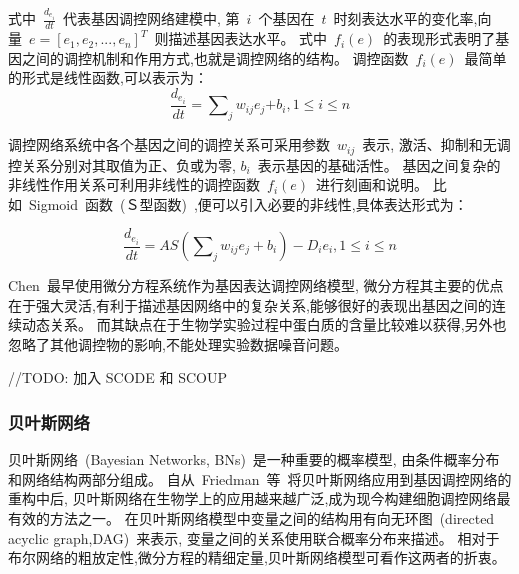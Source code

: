 式中~$\frac{{d_{e_i }}}{{dt}}$~代表基因调控网络建模中,
第~$i$~个基因在~$t$~时刻表达水平的变化率,向量~$e=[e_1,e_2,...,e_n]^T$~则描述基因表达水平。
式中~$f_i(e)$~的表现形式表明了基因之间的调控机制和作用方式,也就是调控网络的结构。
调控函数~$f_i(e)$~最简单的形式是线性函数,可以表示为：
\begin{equation}
\frac{{d_{e_i }}}{{dt}} = \sum\nolimits_j {w_{ij} e_j} { + b_i } ,1 \le i \le n
\end{equation}

调控网络系统中各个基因之间的调控关系可采用参数~$w_{ij}$~表示,
激活、抑制和无调控关系分别对其取值为正、负或为零, $b_i$~表示基因的基础活性。
基因之间复杂的非线性作用关系可利用非线性的调控函数~$f_i(e)$~进行刻画和说明。
比如~Sigmoid~函数~(Ｓ型函数)~,便可以引入必要的非线性,具体表达形式为：

\begin{equation}
\frac{{d_{e_i } }}{{dt}} = AS(\sum\nolimits_j {w_{ij} e_j } + b_i) - D_i e_i ,1 \le i \le n
\end{equation}

Chen~\cite{chen1999modeling}最早使用微分方程系统作为基因表达调控网络模型,
微分方程其主要的优点在于强大灵活,有利于描述基因网络中的复杂关系,能够很好的表现出基因之间的连续动态关系。
而其缺点在于生物学实验过程中蛋白质的含量比较难以获得,另外也忽略了其他调控物的影响,不能处理实验数据噪音问题。

//TODO: 加入 SCODE 和 SCOUP

\subsubsection{贝叶斯网络}
贝叶斯网络~(Bayesian Networks, BNs)~是一种重要的概率模型,
由条件概率分布和网络结构两部分组成。
自从~Friedman~等~\cite{friedman2000using}将贝叶斯网络应用到基因调控网络的重构中后,
贝叶斯网络在生物学上的应用越来越广泛,成为现今构建细胞调控网络最有效的方法之一。
在贝叶斯网络模型中变量之间的结构用有向无环图~(directed acyclic graph,DAG)~来表示,
变量之间的关系使用联合概率分布来描述。
相对于布尔网络的粗放定性,微分方程的精细定量,贝叶斯网络模型可看作这两者的折衷。

